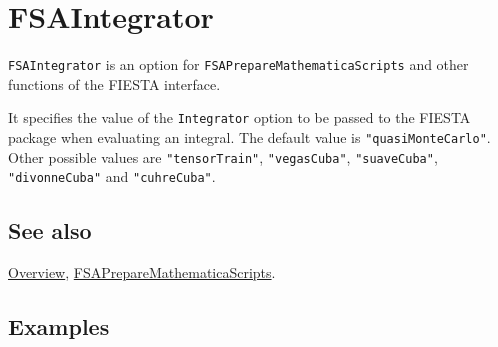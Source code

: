 \documentclass[../FeynHelpersManual.tex]{subfiles}
\begin{document}
\hypertarget{fsaintegrator}{
\section{FSAIntegrator}\label{fsaintegrator}}

\texttt{FSAIntegrator} is an option for
\texttt{FSAPrepareMathematicaScripts} and other functions of the FIESTA
interface.

It specifies the value of the \texttt{Integrator} option to be passed to
the FIESTA package when evaluating an integral. The default value is
\texttt{"quasiMonteCarlo"}. Other possible values are
\texttt{"tensorTrain"}, \texttt{"vegasCuba"}, \texttt{"suaveCuba"},
\texttt{"divonneCuba"} and \texttt{"cuhreCuba"}.

\subsection{See also}

\hyperlink{toc}{Overview},
\hyperlink{fsapreparemathematicascripts}{FSAPrepareMathematicaScripts}.

\subsection{Examples}
\end{document}
